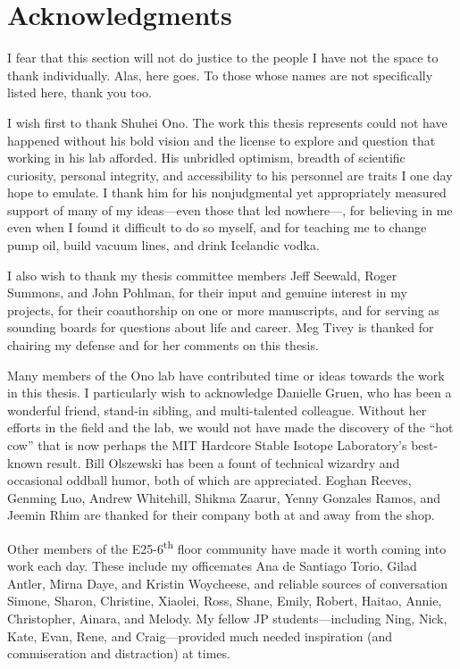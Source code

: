 \chapter*{Acknowledgments}

I fear that this section will not do justice to the people I have not
the space to thank individually. Alas, here goes. To those whose names
are not specifically listed here, thank you too.

I wish first to thank Shuhei Ono. The work this thesis represents could
not have happened without his bold vision and the license to explore and
question that working in his lab afforded. His unbridled optimism,
breadth of scientific curiosity, personal integrity, and accessibility
to his personnel are traits I one day hope to emulate. I thank him for
his nonjudgmental yet appropriately measured support of many of my
ideas---even those that led nowhere---, for believing in me even when I
found it difficult to do so myself, and for teaching me to change pump
oil, build vacuum lines, and drink Icelandic vodka.

I also wish to thank my thesis committee members Jeff Seewald, Roger
Summons, and John Pohlman, for their input and genuine interest in my
projects, for their coauthorship on one or more manuscripts, and for
serving as sounding boards for questions about life and career.  Meg Tivey is thanked for chairing my defense
and for her comments on this thesis.

Many members of the Ono lab have contributed time or ideas towards the
work in this thesis. I particularly wish to acknowledge Danielle Gruen,
who has been a wonderful friend, stand-in sibling, and multi-talented
colleague. Without her efforts in the field and the lab, we would not
have made the discovery of the ``hot cow'' that is now perhaps the MIT
Hardcore Stable Isotope Laboratory's best-known result. Bill Olszewski
has been a fount of technical wizardry and occasional oddball humor,
both of which are appreciated. Eoghan Reeves, Genming Luo, Andrew
Whitehill, Shikma Zaarur, Yenny Gonzales Ramos, and Jeemin Rhim are
thanked for their company both at and away from the shop.

Other members of the E25-6\textsuperscript{th} floor community have made
it worth coming into work each day. These include my officemates Ana de
Santiago Torio, Gilad Antler, Mirna Daye, and Kristin Woycheese, and
reliable sources of conversation Simone, Sharon, Christine, Xiaolei, Ross, Shane, Emily, Robert, Haitao, Annie, Christopher, Ainara, and Melody. My fellow JP students---including Ning, Nick, Kate, Evan, Rene, and Craig---provided much needed inspiration (and commiseration and distraction) at times. 

